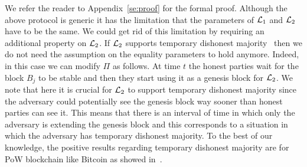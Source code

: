 We refer the reader to Appendix~\ref{se:proof} for the formal proof.
Although the above protocol is generic it has the limitation that the parameters
of $\mathcal{L}_1$ and $\mathcal{L}_2$ have to be the same. We could get rid of this limitation by requiring an additional property on $\mathcal{L}_2$.
If $\mathcal{L}_2$ supports temporary dishonest majority~\cite{DBLP:journals/corr/abs-1908-00427} then we do not need the assumption on the equality parameters to 
hold anymore.
Indeed, in this case we can modify $\Pi$ as follows. At time $t$ the honest parties wait for the block $B_j$ to be stable and then they start using it as a genesis 
block for $\mathcal{L}_2$.  We note that here it is crucial for $\mathcal{L}_2$ to support temporary dishonest majority since the adversary
could potentially see the genesis block way sooner than honest parties can see it. This means that there is an interval of time in which only the adversary is extending 
the genesis block and this corresponds to a situation in which the adversary has temporary dishonest majority.
To the best of our knowledge, the positive results regarding temporary dishonest majority are for PoW blockchain like Bitcoin as showed in~\cite{DBLP:journals/corr/abs-1908-00427}.










